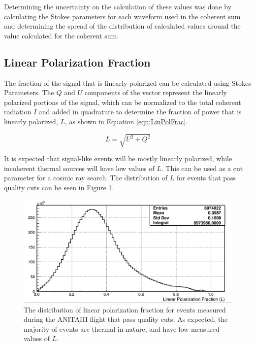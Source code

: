 	 Determining the uncertainty on the calculation of these values was done by calculating the Stokes parameters for each waveform used in the coherent sum and determining the spread of the distribution of calculated values around the value calculated for the coherent sum.
	 
	\subsection{Linear Polarization Fraction}
		The fraction of the signal that is linearly polarized can be calculated using Stokes Parameters.  The $Q$ and $U$ components of the vector represent the linearly polarized portions of the signal, which can be normalized to the total coherent radiation $I$ and added in quadrature to determine the fraction of power that is linearly polarized, $L$, as shown in Equation \ref{eqn:LinPolFrac}.
		
	\begin{equation}
		L=\sqrt{U^2 + Q^2}
	\label{eqn:LinPolFrac}
	\end{equation}
		
	It is expected that signal-like events will be mostly linearly polarized, while incoherent thermal sources will have low values of $L$.  This can be used as a cut parameter for a cosmic ray search.  The distribution of $L$ for events that pass quality cuts can be seen in Figure \ref{fig:LinPolFrac_goodEvs}.
	
	\begin{figure}
	\centering
	\includegraphics[width=\textwidth]{figures/linPolFrac_goodEvs}
	\caption{The distribution of linear polarization fraction for events measured during the ANITAIII flight that pass quality cuts.  As expected, the majority of events are thermal in nature, and have low measured values of $L$.} 
	\label{fig:LinPolFrac_goodEvs}
\end{figure}
	
